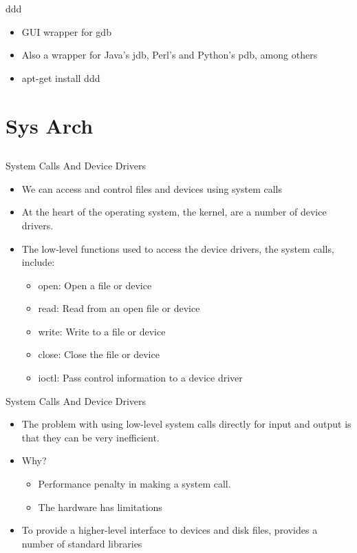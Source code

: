 \documentclass{beamer}
\begin{document}
\begin{frame}{ddd}
\begin{itemize}
\item GUI wrapper for gdb
\item Also a wrapper for Java's jdb, Perl's and Python's pdb, among others
\item apt-get install ddd
\end{itemize}
\end{frame}

\section{Sys Arch}
\subsection{}

\begin{frame}{System Calls And Device Drivers}
\begin{itemize}
\item We can access and control files and devices using system calls
\item At the heart of the operating system, the kernel, are a number of device drivers.
\item The low-level functions used to access the device drivers, the system calls, include:
\begin{itemize}
\item open: Open a file or device
\item read: Read from an open file or device
\item write: Write to a file or device
\item close: Close the file or device
\item ioctl: Pass control information to a device driver
\end{itemize}
\end{itemize}
\end{frame}

\begin{frame}{System Calls And Device Drivers}
\begin{itemize}
\item The problem with using low-level system calls directly for input and output is that they can be very inefficient.
\item Why?
\begin{itemize}
\item Performance penalty in making a system call.
\item The hardware has limitations
\end{itemize}
\item To provide a higher-level interface to devices and disk files, provides a number of standard libraries
\end{itemize}
\end{frame}
\end{document}
